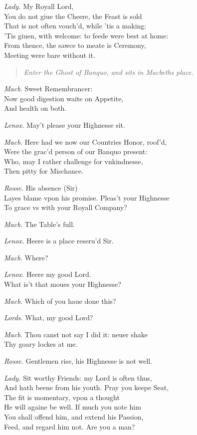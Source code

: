 \documentclass[12pt]{sides}
\newcommand{\StageDir}[1]{\begin{quote}\centering\em #1\end{quote}}
\newcommand{\dia}[1]{\hskip 15pt\textit{#1}\hskip 6pt}
\begin{document}
\begin{multicols}{2}
            \dia{Lady.} My Royall Lord, \\ You do not giue the Cheere, the Feast is sold \\ That is not often vouch'd, while 'tis a making: \\ 'Tis giuen, with welcome: to feede were best at home: \\ From thence, the sawce to meate is Ceremony, \\ Meeting were bare without it.
            \StageDir{Enter the Ghost of Banquo, and sits in Macbeths place.}
            \dia{Macb.} Sweet Remembrancer: \\ Now good digestion waite on Appetite, \\ And health on both.

            \dia{Lenox.} May't please your Highnesse sit.

            \dia{Macb.} Here had we now our Countries Honor, roof'd, \\ Were the grac'd person of our Banquo present: \\ Who, may I rather challenge for vnkindnesse, \\ Then pitty for Mischance.

            \dia{Rosse.} His absence (Sir) \\ Layes blame vpon his promise. Pleas't your Highnesse \\ To grace vs with your Royall Company?

            \dia{Macb.} The Table's full.

            \dia{Lenox.} Heere is a place reseru'd Sir.

            \dia{Macb.} Where?

            \dia{Lenox.} Heere my good Lord. \\ What is't that moues your Highnesse?

            \dia{Macb.} Which of you haue done this?

            \dia{Lords.} What, my good Lord?

            \dia{Macb.} Thou canst not say I did it: neuer shake \\ Thy goary lockes at me.

            \dia{Rosse.} Gentlemen rise, his Highnesse is not well.

            \dia{Lady.} Sit worthy Friends: my Lord is often thus, \\ And hath beene from his youth. Pray you keepe Seat, \\ The fit is momentary, vpon a thought \\ He will againe be well. If much you note him \\ You shall offend him, and extend his Passion, \\ Feed, and regard him not. Are you a man?


\end{multicols}
\end{document}
